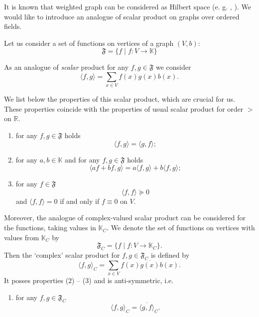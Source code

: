 \documentclass[a4paper,12pt]{amsart}
\theoremstyle{definition}
\newcommand{\K}{\mathbb{K}}
\newcommand{\weight}{b}
\begin{document}
It is known that weighted graph can be considered as Hilbert space (e. g. \cite{Grigoryan}, \cite{KellerBook}). We would like to introduce an analogue of scalar product on graphs over ordered fields.

Let us consider a set of functions on vertices of a graph $(V,b)$:
\begin{equation*}
\mathfrak F=\{f\mid f:V\rightarrow \K\}
\end{equation*}

As an analogue of \emph{scalar} product for any $f,g\in \mathfrak F$ we consider
\begin{equation*}
\langle f,g\rangle=\sum_{x\in V} f(x)g(x)\weight (x).
\end{equation*}


We list below the properties  of this scalar product, which are crucial for us. These properties coincide with the properties of usual scalar product for order $>$ on $\mathbb R$.
\begin{enumerate}
\item 
for any $f,g\in \mathfrak F$ holds
\begin{equation*}
\langle f,g\rangle=\langle g,f\rangle;
\end{equation*}
\item 
for any $a,b\in \K$ and for any $f,g\in \mathfrak F$ holds
\begin{equation*}
\langle af+bf,g\rangle=a\langle f,g\rangle+b\langle f,g\rangle;
\end{equation*}
\item
for any $f\in \mathfrak F$ 
\begin{equation*}
\langle f,f\rangle\succeq 0
\end{equation*}
and  $\langle f,f\rangle = 0$ if and only if $f\equiv 0$ on $V$.
\end{enumerate}
Moreover, the analogue of complex-valued scalar product can be considered for the functions, taking values in $\K_C$. We denote the set of functions on vertices with values from $\K_C$ by 
\begin{equation*}
\mathfrak F_C=\{f\mid f:V\rightarrow \K_C\}.
\end{equation*}
Then the `complex' scalar product for $f,g\in \mathfrak F_C$ is defined by
\begin{equation*}
\langle f,g\rangle_C=\sum_{x\in V} f(x)\overline {g(x)}\weight (x).
\end{equation*}
It posses properties (2) -- (3) and is anti-symmetric, i.e. 
\begin{enumerate}[label=(1*)]
\item for any $f,g\in \mathfrak F_C$ $$\langle f,g\rangle_C=\overline{\langle g,f\rangle}_C.$$
\end{enumerate}
\end{document}
